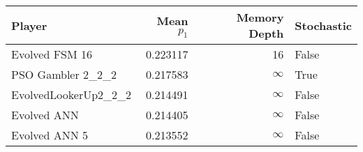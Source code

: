 \begin{tabular}{lrrl}
\toprule
               Player &  Mean $p_1$ &  Memory Depth & Stochastic \\
\midrule
       Evolved FSM 16 &    0.223117 &            16 &      False \\
    PSO Gambler 2\_2\_2 &    0.217583 &            \(\infty\) &       True \\
 EvolvedLookerUp2\_2\_2 &    0.214491 &            \(\infty\) &      False \\
          Evolved ANN &    0.214405 &            \(\infty\) &      False \\
        Evolved ANN 5 &    0.213552 &            \(\infty\) &      False \\
\bottomrule
\end{tabular}

